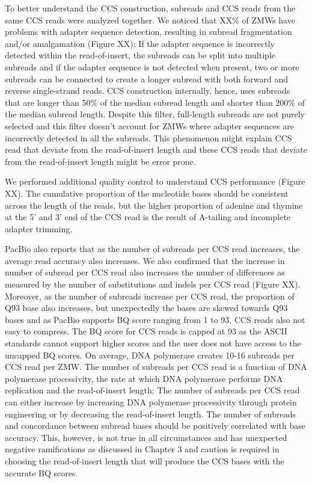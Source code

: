 To better understand the CCS construction, subreads and CCS reads from the same CCS reads were analyzed together. We noticed that XX\% of ZMWs have problems with adapter sequence detection, resulting in subread fragmentation and/or amalgamation (Figure XX); If the adapter sequence is incorrectly detected within the read-of-insert, the subreads can be split into multiple subreads and if the adapter sequence is not detected when present, two or more subreads can be connected to create a longer subread with both forward and reverse single-strand reads. CCS construction internally, hence, uses subreads that are longer than 50\% of the median subread length and shorter than 200\% of the median subread length. Despite this filter, full-length subreads are not purely selected and this filter doesn’t account for ZMWs where adapter sequences are incorrectly detected in all the subreads.  This phenomenon might explain CCS read that deviate from the read-of-insert length and these CCS reads that deviate from the read-of-insert length might be error prone.

We performed additional quality control to understand CCS performance (Figure XX). The cumulative proportion of the nucleotide bases should be consistent across the length of the reads, but the higher proportion of adenine and thymine at the 5’ and 3’ end of the CCS read is the result of A-tailing and incomplete adapter trimming. 

PacBio also reports that as the number of subreads per CCS read increases, the average read accuracy also increases. We also confirmed that the increase in number of subread per CCS read also increases the number of differences as measured by the number of substitutions and indels per CCS read (Figure XX). Moreover, as the number of subreads increase per CCS read, the proportion of Q93 base also increases, but unexpectedly the bases are skewed towards Q93 bases and as PacBio supports BQ score ranging from 1 to 93, CCS reads also not easy to compress. The BQ score for CCS reads is capped at 93 as the ASCII standards cannot support higher scores and the user does not have access to the uncapped BQ scores. On average, DNA polymerase creates 10-16 subreads per CCS read per ZMW. The number of subreads per CCS read is a function of DNA polymerase processivity, the rate at which DNA polymerase performs DNA replication and the read-of-insert length; The number of subreads per CCS read can either increase by increasing DNA polymerase processivity through protein engineering or by decreasing the read-of-insert length. The number of subreads and concordance between subread bases should be positively correlated with base accuracy. This, however, is not true in all circumstances and has unexpected negative ramifications as discussed in Chapter 3 and caution is required in choosing the read-of-insert length that will produce the CCS bases with the accurate BQ scores.

